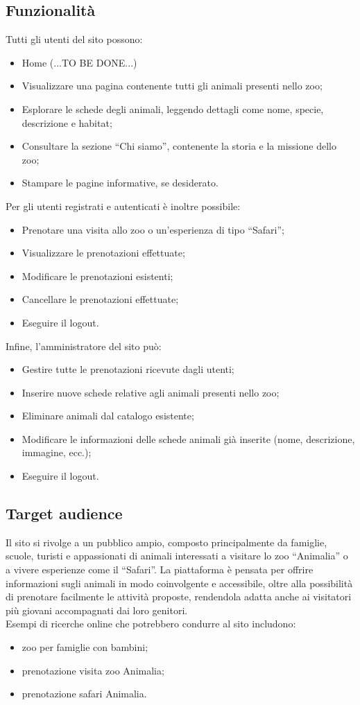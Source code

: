 \subsection{Funzionalit\`a}
Tutti gli utenti del sito possono:
\begin{itemize}
    \item Home (...TO BE DONE...)
    \item Visualizzare una pagina contenente tutti gli animali presenti nello zoo;
    \item Esplorare le schede degli animali, leggendo dettagli come nome, specie, descrizione e habitat;
    \item Consultare la sezione ``Chi siamo'', contenente la storia e la missione dello zoo;
    \item Stampare le pagine informative, se desiderato.
\end{itemize}
Per gli utenti registrati e autenticati è inoltre possibile:
\begin{itemize}
    \item Prenotare una visita allo zoo o un’esperienza di tipo ``Safari'';
    \item Visualizzare le prenotazioni effettuate;
    \item Modificare le prenotazioni esistenti;
    \item Cancellare le prenotazioni effettuate;
    \item Eseguire il logout.
\end{itemize}
Infine, l’amministratore del sito può:
\begin{itemize}
    \item Gestire tutte le prenotazioni ricevute dagli utenti;
    \item Inserire nuove schede relative agli animali presenti nello zoo;
    \item Eliminare animali dal catalogo esistente;
    \item Modificare le informazioni delle schede animali già inserite (nome, descrizione, immagine, ecc.);
    \item Eseguire il logout.
\end{itemize}

\subsection{Target audience}
Il sito si rivolge a un pubblico ampio, composto principalmente da famiglie, scuole, turisti e appassionati di animali interessati a visitare lo zoo ``Animalia'' o a vivere esperienze come il ``Safari''. La piattaforma è pensata per offrire informazioni sugli animali in modo coinvolgente e accessibile, oltre alla possibilità di prenotare facilmente le attività proposte, rendendola adatta anche ai visitatori più giovani accompagnati dai loro genitori.\\
Esempi di ricerche online che potrebbero condurre al sito includono:
\begin{itemize}
    \item zoo per famiglie con bambini;
    \item prenotazione visita zoo Animalia;
    \item prenotazione safari Animalia.
\end{itemize}
